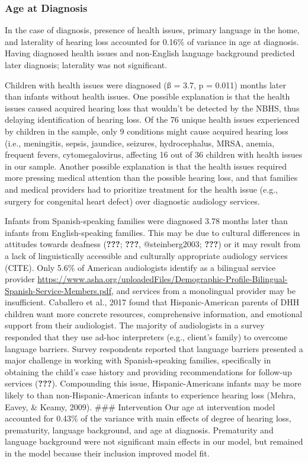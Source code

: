 \documentclass[english,man]{apa6}
\begin{document}
\hypertarget{age-at-diagnosis}{%
\subsubsection{Age at Diagnosis}\label{age-at-diagnosis}}

In the case of diagnosis, presence of health issues, primary language in the home, and laterality of hearing loss accounted for 0.16\% of variance in age at diagnosis. Having diagnosed health issues and non-English language background predicted later diagnosis; laterality was not significant.

Children with health issues were diagnosed (ß = 3.7, p = 0.011) months later than infants without health issues. One possible explanation is that the health issues caused acquired hearing loss that wouldn't be detected by the NBHS, thus delaying identification of hearing loss. Of the 76 unique health issues experienced by children in the sample, only 9 conditions might cause acquired hearing loss (i.e., meningitis, sepsis, jaundice, seizures, hydrocephalus, MRSA, anemia, frequent fevers, cytomegalovirus, affecting 16 out of 36 children with health issues in our sample. Another possible explanation is that the health issues required more pressing medical attention than the possible hearing loss, and that families and medical providers had to prioritize treatment for the health issue (e.g., surgery for congenital heart defect) over diagnostic audiology services.

Infants from Spanish-speaking families were diagnosed 3.78 months later than infants from English-speaking families. This may be due to cultural differences in attitudes towards deafness ({\textbf{???}}; {\textbf{???}}, @steinberg2003; {\textbf{???}}) or it may result from a lack of linguistically accessible and culturally appropriate audiology services (CITE). Only 5.6\% of American audiologists identify as a bilingual service provider \url{https://www.asha.org/uploadedFiles/Demographic-Profile-Bilingual-Spanish-Service-Members.pdf}, and services from a monolingual provider may be insufficient. Caballero et al., 2017 found that Hispanic-American parents of DHH children want more concrete resources, comprehensive information, and emotional support from their audiologist. The majority of audiologists in a survey responded that they use ad-hoc interpreters (e.g., client's family) to overcome language barriers. Survey respondents reported that language barriers presented a major challenge in working with Spanish-speaking families, specifically in obtaining the child's case history and providing recommendations for follow-up services ({\textbf{???}}). Compounding this issue, Hispanic-Americans infants may be more likely to than non-Hispanic-American infants to experience hearing loss (Mehra, Eavey, \& Keamy, 2009).
\#\#\# Intervention
Our age at intervention model accounted for 0.43\% of the variance with main effects of degree of hearing loss, prematurity, language background, and age at diagnosis. Prematurity and language background were not significant main effects in our model, but remained in the model because their inclusion improved model fit.
\end{document}
